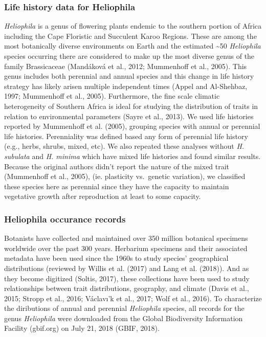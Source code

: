 \documentclass[man,floatsintext]{apa6}
\theoremstyle{definition}
\theoremstyle{definition}
\theoremstyle{definition}
\theoremstyle{remark}
\begin{document}
\hypertarget{life-history-data-for-heliophila}{%
\subsubsection{Life history data for
Heliophila}\label{life-history-data-for-heliophila}}

\emph{Heliophila} is a genus of flowering plants endemic to the southern
portion of Africa including the Cape Floristic and Succulent Karoo
Regions. These are among the most botanically diverse environments on
Earth and the estimated \textasciitilde{}50 \emph{Heliophila} species
occurring there are considered to make up the most diverse genus of the
family Brassicaceae (Mandáková et al., 2012; Mummenhoff et al., 2005).
This genus includes both perennial and annual species and this change in
life history strategy has likely arisen multiple independent times
(Appel and Al-Shehbaz, 1997; Mummenhoff et al., 2005). Furthermore, the
fine scale climatic heterogeneity of Southern Africa is ideal for
studying the distribution of traits in relation to environmental
parameters (Sayre et al., 2013). We used life histories reported by
Mummenhoff et al. (2005), grouping species with annual or perennial life
histories. Perenniality was defined based any form of perennial life
history (e.g., herbs, shrubs, mixed, etc). We also repeated these
analyses without \emph{H. subulata} and \emph{H. minima} which have
mixed life histories and found similar results. Because the original
authors didn't report the nature of the mixed trait (Mummenhoff et al.,
2005), (ie. plasticity vs.~genetic variation), we classified these
species here as perennial since they have the capacity to maintain
vegetative growth after reproduction at least to some capacity.

\hypertarget{heliophila-occurance-records}{%
\subsubsection{Heliophila occurance
records}\label{heliophila-occurance-records}}

Botanists have collected and maintained over 350 million botanical
specimens worldwide over the past 300 years. Herbarium specimens and
their associated metadata have been used since the 1960s to study
species' geographical distributions (reviewed by Willis et al. (2017)
and Lang et al. (2018)). And as they become digitized (Soltis, 2017),
these collections have been used to study relationships between trait
distributions, geography, and climate (Davis et al., 2015; Stropp et
al., 2016; Václavı'k et al., 2017; Wolf et al., 2016). To characterize
the diributions of annual and perennial \emph{Heliophila} species, all
records for the genus \emph{Heliophila} were downloaded from the Global
Biodiversity Information Facility (gbif.org) on July 21, 2018 (GBIF,
2018).
\end{document}
